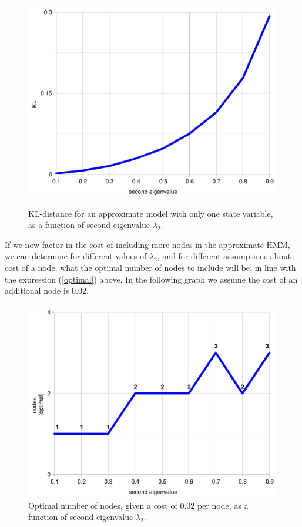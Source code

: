 \documentclass[10pt,letterpaper]{article}
\begin{document}
 \begin{figure}[h]  \begin{center}
 \label{kl-eigen}
\includegraphics[scale=0.33]{kl-eigenvalue-5.pdf} \caption{KL-distance for an approximate model with only one state variable, as a function of second eigenvalue $\lambda_2$.} \end{center} 
\end{figure}

If we now factor in the cost of including more nodes in the approximate HMM, we can determine for different values of $\lambda_2$, and for different assumptions about cost of a node, what the optimal number of nodes to include will be, in line with the expression (\ref{optimal}) above. In the following graph we assume the cost of an additional node is $0.02$.

 \begin{figure}[h]  \begin{center}
\includegraphics[scale=0.33]{kl-eigenvalue-6.pdf} \caption{Optimal number of nodes, given a cost of $0.02$ per node, as a function of second eigenvalue $\lambda_2$.} \end{center} 
\label{kl-eigen1}\end{figure}
\end{document}
